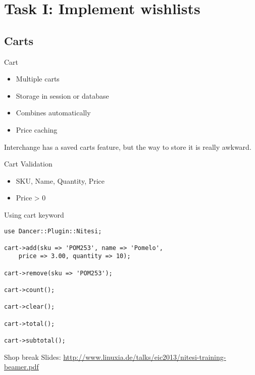 \section{Task I: Implement wishlists}


\subsection{Carts}
\begin{frame}{Cart}
\begin{itemize}
\item Multiple carts
\item Storage in session or database
\item Combines automatically
\item Price caching
\end{itemize}
\end{frame}

Interchange has a saved carts feature, but the way to store it is
really awkward.

\begin{frame}{Cart Validation}
\begin{itemize}
\item SKU, Name, Quantity, Price
\item Price > 0
\end{itemize}
\end{frame}

\begin{frame}[fragile]{Using cart keyword}
\begin{lstlisting}
use Dancer::Plugin::Nitesi;

cart->add(sku => 'POM253', name => 'Pomelo',
    price => 3.00, quantity => 10);

cart->remove(sku => 'POM253');

cart->count();

cart->clear();

cart->total();

cart->subtotal();
\end{lstlisting}
\end{frame}

\begin{frame}{Shop break}
Slides:
\url{http://www.linuxia.de/talks/eic2013/nitesi-training-beamer.pdf}
\end{frame}



